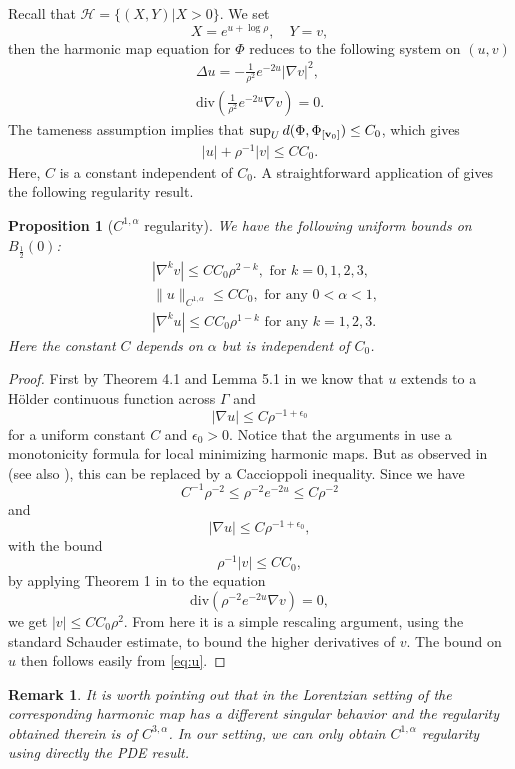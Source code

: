 \documentclass[a4paper,11pt]{amsart}
\newtheorem{proposition}[theorem]{Proposition}
\newtheorem{remark}[theorem]{Remark}
\theoremstyle{definition}
\numberwithin{equation}{section}
\DeclareMathOperator{\bv}{{\bf v}}
\begin{document}
  Recall that $\mathcal H=\{(X, Y)|X>0\}$. We set
$$X=e^{u+\log\rho}, \quad Y=v, $$ then the harmonic map equation for $\Phi$ reduces to the following system on $(u, v)$
\begin{align}
	\Delta u=-\frac{1}{\rho^2}e^{-2u}|\nabla v|^2,\label{eq:u}\\
	\mathrm{div}\left(\frac{1}{\rho^2}e^{-2u}\nabla v\right)=0.\label{eq:v}
\end{align}
The tameness assumption implies that $\sup_Ud(\Phi, \Phi_{[\bv_0]})\leq C_0$, which gives 
\begin{align}\label{eq:bounded distance condition}
	|u|+\rho^{-1}|v|\leq C C_0.
\end{align}
Here, $C$ is a constant independent of $C_0$.
A straightforward application of \cite{LiTian,Nguyen} gives the following regularity result. 
\begin{proposition}[$C^{1,\alpha}$ regularity]\label{thm:C11 regularity}
	We have the following uniform bounds on $B_{\frac{1}{2}}(0)$:
	\begin{align*}
		&|\nabla^{k}v|\leq CC_0\rho^{2-k},\text{ for $k=0,1,2,3$},\\
		&\|u\|_{C^{1,\alpha}}\leq CC_0,\text{ for any $0<\alpha<1$},\\
        &|\nabla^ku|\leq CC_0\rho^{1-k}\text{ for any $k=1,2,3$}.
	\end{align*}
    Here the constant $C$ depends on $\alpha$ but is independent of $C_0$.
\end{proposition}
\begin{proof}
First by Theorem 4.1 and Lemma 5.1 in \cite{LiTian} we know that $u$ extends to a H\"older continuous function across $\Gamma$ and $$|\nabla u|\leq C \rho^{-1+\epsilon_0}$$ for a uniform constant $C$ and $\epsilon_0>0$. Notice that the arguments in \cite{LiTian} use a monotonicity formula for local minimizing harmonic maps. But as observed in \cite{Nguyen} (see also \cite{HKWX}), this can be replaced by a Caccioppoli inequality. 	Since we have $$C^{-1}\rho^{-2}\leq \rho^{-2}e^{-2u}\leq C\rho^{-2}$$ and $$|\nabla u|\leq C\rho^{-1+\epsilon_0},$$ with the bound $$\rho^{-1}|v|\leq CC_0,$$ by applying Theorem 1 in \cite{Nguyen} to the equation $$\mathrm{div}(\rho^{-2}e^{-2u}\nabla v)=0,$$ we get $|v|\leq CC_0\rho^2$. From here it is a simple rescaling argument, using the standard Schauder estimate, to bound the higher derivatives of $v$. The bound on $u$ then follows easily from \eqref{eq:u}.

\end{proof}
\begin{remark}It is worth pointing out that in the Lorentzian setting of \cite{LiTian, Nguyen, HKWX} the corresponding harmonic map has a different singular behavior and the regularity obtained therein is of $C^{3, \alpha}$. In our setting, we can only obtain $C^{1, \alpha}$ regularity using directly the PDE result.	
\end{remark}
\end{document}
